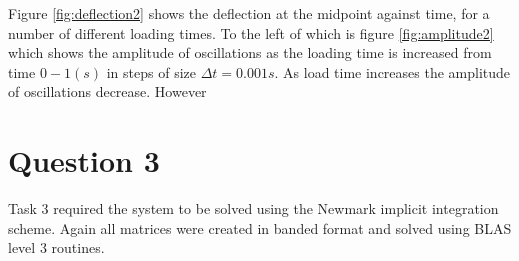 \documentclass[10pt, a4paper]{article}
\begin{document}
Figure \ref{fig:deflection2} shows the deflection at the midpoint against time, for a number of different loading times. To the left of which is figure \ref{fig:amplitude2} which shows the amplitude of oscillations as the loading time is increased from time $0 - 1 (s)$ in steps of size $\Delta t = 0.001 s$. As load time increases the amplitude of oscillations decrease. However 
\section*{Question 3}

Task 3 required the system to be solved using the Newmark implicit integration scheme. Again all matrices were created in banded format and solved using BLAS level 3 routines.
\end{document}

